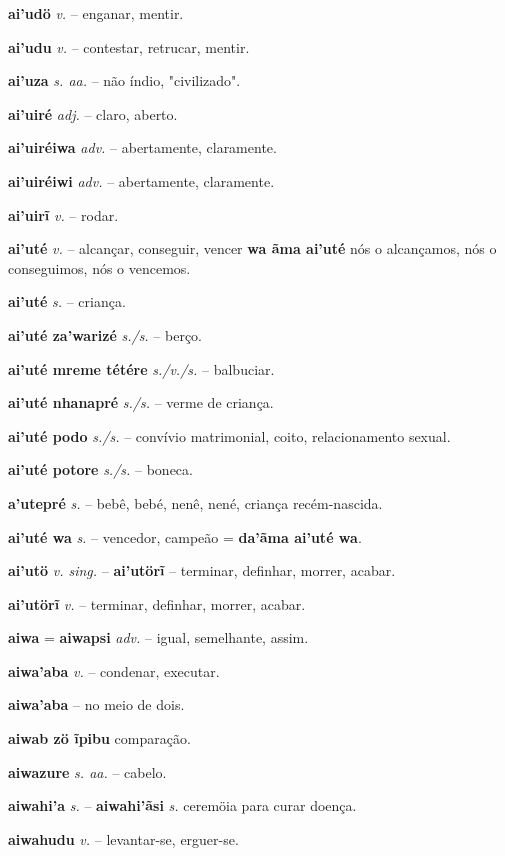 \textbf{ai'udö} \textit{v.} -- enganar, mentir.

\textbf{ai'udu} \textit{v.} -- contestar, retrucar, mentir.

\textbf{ai'uza} \textit{s. aa.} -- não índio, "civilizado".

\textbf{ai'uiré} \textit{adj.} -- claro, aberto.

\textbf{ai'uiréiwa} \textit{adv.} -- abertamente, claramente.

\textbf{ai'uiréiwi} \textit{adv.} -- abertamente, claramente.

\textbf{ai'uirĩ} \textit{v.} -- rodar.

\textbf{ai'uté} \textit{v.} -- alcançar, conseguir, vencer  \textbf{wa ãma ai'uté} nós o alcançamos, nós o conseguimos, nós o vencemos.

\textbf{ai'uté} \textit{s.} -- criança.

\textbf{ai'uté za'warizé} \textit{s./s.} -- berço.

\textbf{ai'uté mreme tétére} \textit{s./v./s.} -- balbuciar.

\textbf{ai'uté nhanapré} \textit{s./s.} -- verme de criança.

\textbf{ai'uté podo} \textit{s./s.} -- convívio matrimonial, coito, relacionamento sexual.

\textbf{ai'uté potore} \textit{s./s.} -- boneca.

\textbf{a'utepré} \textit{s.} -- bebê, bebé, nenê, nené, criança recém-nascida.

\textbf{ai'uté wa} \textit{s.} -- vencedor, campeão = \textbf{da'ãma ai'uté wa}.

\textbf{ai'utö} \textit{v. sing.} -- \textbf{ai'utörĩ} -- terminar, definhar, morrer, acabar.

\textbf{ai'utörĩ} \textit{v.} -- terminar, definhar, morrer, acabar.

\textbf{aiwa} = \textbf{aiwapsi} \textit{adv.} -- igual, semelhante, assim.

\textbf{aiwa'aba} \textit{v.} -- condenar, executar.

\textbf{aiwa'aba} -- no meio de dois.

\textbf{aiwab zö ĩpibu} comparação.

\textbf{aiwazure} \textit{s. aa.} -- cabelo.

\textbf{aiwahi'a} \textit{s.} -- \textbf{aiwahi'ãsi} \textit{s.} ceremöia para curar doença.

\textbf{aiwahudu} \textit{v.} -- levantar-se, erguer-se.

